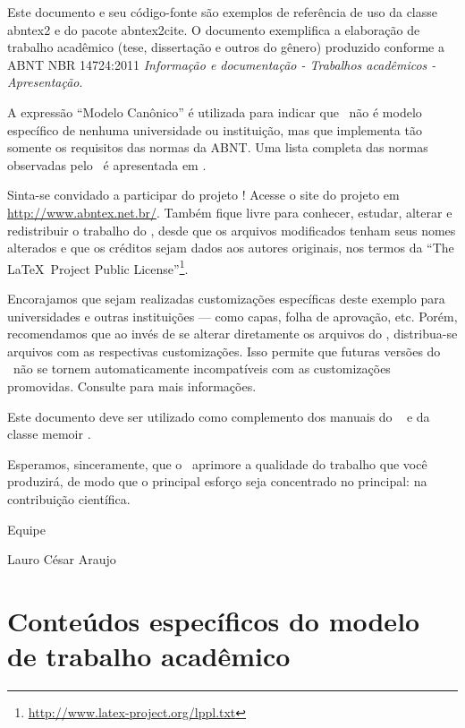 \documentclass[
	12pt,				%
	openright,			%
	oneside,			%
	a4paper,			%
	english,			%
	brazil				%
	]{abntex2}
\begin{document}
Este documento e seu código-fonte são exemplos de referência de uso da classe
\textsf{abntex2} e do pacote \textsf{abntex2cite}. O documento 
exemplifica a elaboração de trabalho acadêmico (tese, dissertação e outros do
gênero) produzido conforme a ABNT NBR 14724:2011 \emph{Informação e documentação
- Trabalhos acadêmicos - Apresentação}.

A expressão ``Modelo Canônico'' é utilizada para indicar que \abnTeX\ não é
modelo específico de nenhuma universidade ou instituição, mas que implementa tão
somente os requisitos das normas da ABNT. Uma lista completa das normas
observadas pelo \abnTeX\ é apresentada em \cite{abntex2classe}.

Sinta-se convidado a participar do projeto \abnTeX! Acesse o site do projeto em
\url{http://www.abntex.net.br/}. Também fique livre para conhecer,
estudar, alterar e redistribuir o trabalho do \abnTeX, desde que os arquivos
modificados tenham seus nomes alterados e que os créditos sejam dados aos
autores originais, nos termos da ``The \LaTeX\ Project Public
License''\footnote{\url{http://www.latex-project.org/lppl.txt}}.

Encorajamos que sejam realizadas customizações específicas deste exemplo para
universidades e outras instituições --- como capas, folha de aprovação, etc.
Porém, recomendamos que ao invés de se alterar diretamente os arquivos do
\abnTeX, distribua-se arquivos com as respectivas customizações.
Isso permite que futuras versões do \abnTeX~não se tornem automaticamente
incompatíveis com as customizações promovidas. Consulte
\cite{abntex2-wiki-como-customizar} para mais informações.

Este documento deve ser utilizado como complemento dos manuais do \abnTeX\ 
\cite{abntex2classe,abntex2cite,abntex2cite-alf} e da classe \textsf{memoir}
\cite{memoir}. 

Esperamos, sinceramente, que o \abnTeX\ aprimore a qualidade do trabalho que
você produzirá, de modo que o principal esforço seja concentrado no principal:
na contribuição científica.

Equipe \abnTeX 

Lauro César Araujo



\chapter{Conteúdos específicos do modelo de trabalho acadêmico}\label{cap_trabalho_academico}
\end{document}

